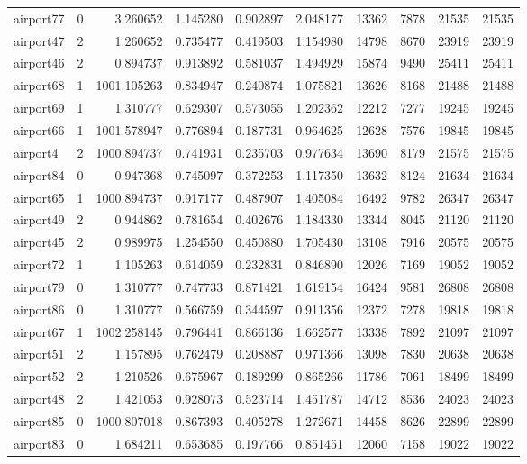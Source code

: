 \begin{longtable}{|l|r|r|r|r|r|r|r|r|r|}
airport77 & 0 & 3.260652 & 1.145280 & 0.902897 & 2.048177 & 13362 & 7878 & 21535 & 21535 \\
airport47 & 2 & 1.260652 & 0.735477 & 0.419503 & 1.154980 & 14798 & 8670 & 23919 & 23919 \\
airport46 & 2 & 0.894737 & 0.913892 & 0.581037 & 1.494929 & 15874 & 9490 & 25411 & 25411 \\
airport68 & 1 & 1001.105263 & 0.834947 & 0.240874 & 1.075821 & 13626 & 8168 & 21488 & 21488 \\
airport69 & 1 & 1.310777 & 0.629307 & 0.573055 & 1.202362 & 12212 & 7277 & 19245 & 19245 \\
airport66 & 1 & 1001.578947 & 0.776894 & 0.187731 & 0.964625 & 12628 & 7576 & 19845 & 19845 \\
airport4 & 2 & 1000.894737 & 0.741931 & 0.235703 & 0.977634 & 13690 & 8179 & 21575 & 21575 \\
airport84 & 0 & 0.947368 & 0.745097 & 0.372253 & 1.117350 & 13632 & 8124 & 21634 & 21634 \\
airport65 & 1 & 1000.894737 & 0.917177 & 0.487907 & 1.405084 & 16492 & 9782 & 26347 & 26347 \\
airport49 & 2 & 0.944862 & 0.781654 & 0.402676 & 1.184330 & 13344 & 8045 & 21120 & 21120 \\
airport45 & 2 & 0.989975 & 1.254550 & 0.450880 & 1.705430 & 13108 & 7916 & 20575 & 20575 \\
airport72 & 1 & 1.105263 & 0.614059 & 0.232831 & 0.846890 & 12026 & 7169 & 19052 & 19052 \\
airport79 & 0 & 1.310777 & 0.747733 & 0.871421 & 1.619154 & 16424 & 9581 & 26808 & 26808 \\
airport86 & 0 & 1.310777 & 0.566759 & 0.344597 & 0.911356 & 12372 & 7278 & 19818 & 19818 \\
airport67 & 1 & 1002.258145 & 0.796441 & 0.866136 & 1.662577 & 13338 & 7892 & 21097 & 21097 \\
airport51 & 2 & 1.157895 & 0.762479 & 0.208887 & 0.971366 & 13098 & 7830 & 20638 & 20638 \\
airport52 & 2 & 1.210526 & 0.675967 & 0.189299 & 0.865266 & 11786 & 7061 & 18499 & 18499 \\
airport48 & 2 & 1.421053 & 0.928073 & 0.523714 & 1.451787 & 14712 & 8536 & 24023 & 24023 \\
airport85 & 0 & 1000.807018 & 0.867393 & 0.405278 & 1.272671 & 14458 & 8626 & 22899 & 22899 \\
airport83 & 0 & 1.684211 & 0.653685 & 0.197766 & 0.851451 & 12060 & 7158 & 19022 & 19022 \\

\end{longtable}

